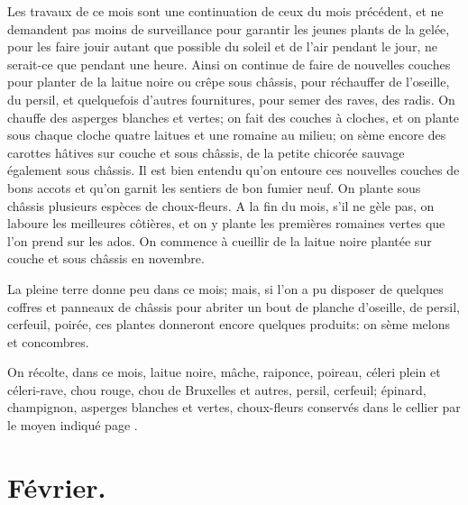 \documentclass[10pt,a4paper]{book}
\begin{document}
Les travaux de ce mois sont une continuation de ceux du mois précédent, et ne demandent pas moins de surveillance pour garantir les jeunes plants de la gelée, pour les faire jouir autant que possible du soleil et de l'air pendant le jour, ne serait-ce que pendant une heure. Ainsi on continue de faire de nouvelles couches pour planter de la laitue noire ou crêpe sous châssis, pour réchauffer de l'oseille, du persil, et quelquefois d'autres fournitures, pour semer des raves, des radis. On chauffe des asperges blanches et vertes; on fait des couches à cloches, et on plante sous chaque cloche quatre laitues et une romaine au milieu; on sème encore des carottes hâtives sur couche et sous châssis, de la petite chicorée sauvage également sous châssis. Il est bien entendu qu'on entoure ces nouvelles couches de bons accots et qu'on garnit les sentiers de bon fumier neuf. On plante sous châssis plusieurs espèces de choux-fleurs. A la fin du mois, s'il ne gèle pas, on laboure les meilleures côtières, et on y plante les premières romaines vertes que l'on prend sur les ados. On commence à cueillir de la laitue noire plantée sur couche et sous châssis en novembre.

La pleine terre donne peu dans ce mois; mais, si l'on a pu disposer de quelques coffres et panneaux de châssis pour abriter un bout de planche d'oseille, de persil, cerfeuil, poirée, ces plantes donneront encore quelques produits: on sème melons et concombres.

On récolte, dans ce mois, laitue noire, mâche, raiponce, poireau, céleri plein et céleri-rave, chou rouge, chou de Bruxelles et autres, persil, cerfeuil; épinard, champignon, asperges blanches et vertes, choux-fleurs conservés dans le cellier par le moyen indiqué page \pageref{conserverchoufleur}.

\section{Février.}
\end{document}
